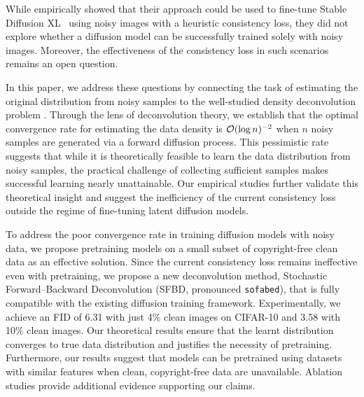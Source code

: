 While \citet{DarasDD2024} empirically showed that their approach could be used to fine-tune Stable Diffusion XL~\citep{PodellELBDMPR2023} using noisy images with a heuristic consistency loss, they did not explore whether a diffusion model can be successfully trained solely with noisy images. Moreover, the effectiveness of the consistency loss in such scenarios remains an open question. 

In this paper, we address these questions by connecting the task of estimating the original distribution from noisy samples to the well-studied density deconvolution problem \citep{Meister2009}. Through the lens of deconvolution theory, we establish that the optimal convergence rate for estimating the data density is $\mathcal{O}(\log n)^{-2}$ when $n$ noisy samples are generated via a forward diffusion process. This pessimistic rate suggests that while it is theoretically feasible to learn the data distribution from noisy samples, the practical challenge of collecting sufficient samples makes successful learning nearly unattainable. Our empirical studies further validate this theoretical insight and suggest the inefficiency of the current consistency loss outside the regime of fine-tuning latent diffusion models.


To address the poor convergence rate in training diffusion models with noisy data, we propose pretraining models on a small subset of copyright-free clean data as an effective solution. Since the current consistency loss remains ineffective even with pretraining, we propose a new deconvolution method, Stochastic Forward–Backward Deconvolution (SFBD, pronounced \texttt{sofabed}), that is fully compatible with the existing diffusion training framework. Experimentally, we achieve an FID of 6.31 with just 4\% clean images on CIFAR-10 and 3.58 with 10\% clean images. Our theoretical results ensure that the learnt distribution converges to true data distribution and justifies the necessity of pretraining. Furthermore, our results suggest that models can be pretrained using datasets with similar features when clean, copyright-free data are unavailable. Ablation studies provide additional evidence supporting our claims.
